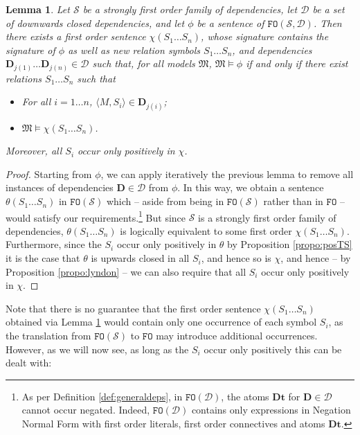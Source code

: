 \documentclass{article}
\newtheorem{Lemma}[Theorem]{Lemma}
\theoremstyle{definition}
\newcommand{\tuple}{\mathbf}
\newcommand{\FO}{\texttt{FO}}
\newcommand{\M}{\mathfrak M}
\newcommand{\D}{\mathbf D}
\newcommand{\DD}{\mathcal D}
\newcommand{\SSd}{\mathcal S}
\begin{document}
\begin{Lemma}
	Let $\SSd$ be a strongly first order family of dependencies, let $\DD$ be a set of downwards closed dependencies, and let $\phi$ be a sentence of $\FO(\SSd, \DD)$. Then there exists a first order sentence $\chi(S_1 \ldots S_n)$, whose signature contains the signature of $\phi$ as well as new relation symbols $S_1 \ldots S_n$, and dependencies $\D_{j(1)} \ldots \D_{j(n)} \in \DD$ such that, for all models $\M$, $\M \models \phi$ if and only if there exist relations $S_1 \ldots S_n$ such that 
	\begin{itemize}
		\item For all $i = 1 \ldots n$, $\langle M, S_i\rangle \in \D_{j(i)}$; 
		\item $\M \models \chi(S_1 \ldots S_n)$. 
	\end{itemize}
	
	Moreover, all $S_i$ occur only positively in $\chi$.
\label{lemma:removeSFO}
\end{Lemma}
\begin{proof}
	Starting from $\phi$, we can apply iteratively the previous lemma to remove all instances of dependencies $\D \in \DD$ from $\phi$. In this way, we obtain a sentence $\theta(S_1 \ldots S_n)$ in $\FO(\SSd)$ which -- aside from being in $\FO(\SSd)$ rather than in $\FO$ -- would satisfy our requirements.\footnote{As per Definition \ref{def:generaldeps}, in $\FO(\DD)$, the atoms $\D \tuple t$ for $\D \in \DD$ cannot occur negated. Indeed, $\FO(\DD)$ contains only expressions in Negation Normal Form with first order literals, first order connectives and atoms $\D \tuple t$.} But since $\SSd$ is a strongly first order family of dependencies, $\theta(S_1 \ldots S_n)$ is logically equivalent to some first order $\chi(S_1 \ldots S_n)$. Furthermore, since the $S_i$ occur only positively in $\theta$ by Proposition \ref{propo:posTS} it is the case that $\theta$ is upwards closed in all $S_i$, and hence so is $\chi$, and hence -- by Proposition \ref{propo:lyndon} -- we can also require that all $S_i$ occur only positively in $\chi$. 
\end{proof}
Note that there is no guarantee that the first order sentence $\chi(S_1 \ldots S_n)$ obtained via Lemma \ref{lemma:removeSFO} would contain only one occurrence of each symbol $S_i$, as the translation from $\FO(\SSd)$ to $\FO$ may introduce additional occurrences. However, as we will now see, as long as the $S_i$ occur only positively this can be dealt with: 
\end{document}
